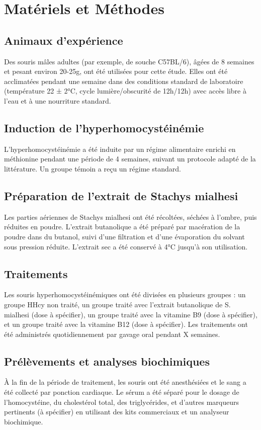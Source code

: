\section{Matériels et Méthodes}
\subsection{Animaux d'expérience}
Des souris mâles adultes (par exemple, de souche C57BL/6), âgées de 8 semaines et pesant environ 20-25g, ont été utilisées pour cette étude. Elles ont été acclimatées pendant une semaine dans des conditions standard de laboratoire (température 22 ± 2°C, cycle lumière/obscurité de 12h/12h) avec accès libre à l'eau et à une nourriture standard.

\subsection{Induction de l'hyperhomocystéinémie}
L'hyperhomocystéinémie a été induite par un régime alimentaire enrichi en méthionine pendant une période de 4 semaines, suivant un protocole adapté de la littérature. Un groupe témoin a reçu un régime standard.

\subsection{Préparation de l'extrait de Stachys mialhesi}
Les parties aériennes de Stachys mialhesi ont été récoltées, séchées à l'ombre, puis réduites en poudre. L'extrait butanolique a été préparé par macération de la poudre dans du butanol, suivi d'une filtration et d'une évaporation du solvant sous pression réduite. L'extrait sec a été conservé à 4°C jusqu'à son utilisation.

\subsection{Traitements}
Les souris hyperhomocystéinémiques ont été divisées en plusieurs groupes : un groupe HHcy non traité, un groupe traité avec l'extrait butanolique de S. mialhesi (dose à spécifier), un groupe traité avec la vitamine B9 (dose à spécifier), et un groupe traité avec la vitamine B12 (dose à spécifier). Les traitements ont été administrés quotidiennement par gavage oral pendant X semaines.

\subsection{Prélèvements et analyses biochimiques}
À la fin de la période de traitement, les souris ont été anesthésiées et le sang a été collecté par ponction cardiaque. Le sérum a été séparé pour le dosage de l'homocystéine, du cholestérol total, des triglycérides, et d'autres marqueurs pertinents (à spécifier) en utilisant des kits commerciaux et un analyseur biochimique.

